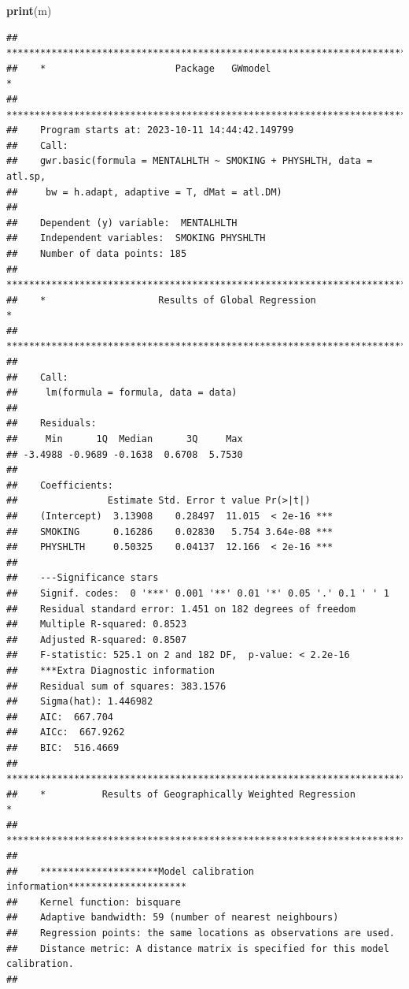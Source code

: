 \documentclass[
]{book}
\newenvironment{Shaded}{\begin{snugshade}}{\end{snugshade}}
\newcommand{\FunctionTok}[1]{\textcolor[rgb]{0.13,0.29,0.53}{\textbf{#1}}}
\newcommand{\NormalTok}[1]{#1}
\begin{document}
\begin{Shaded}
\begin{Highlighting}[]
\FunctionTok{print}\NormalTok{(m)}
\end{Highlighting}
\end{Shaded}

\begin{verbatim}
##    ***********************************************************************
##    *                       Package   GWmodel                             *
##    ***********************************************************************
##    Program starts at: 2023-10-11 14:44:42.149799 
##    Call:
##    gwr.basic(formula = MENTALHLTH ~ SMOKING + PHYSHLTH, data = atl.sp, 
##     bw = h.adapt, adaptive = T, dMat = atl.DM)
## 
##    Dependent (y) variable:  MENTALHLTH
##    Independent variables:  SMOKING PHYSHLTH
##    Number of data points: 185
##    ***********************************************************************
##    *                    Results of Global Regression                     *
##    ***********************************************************************
## 
##    Call:
##     lm(formula = formula, data = data)
## 
##    Residuals:
##     Min      1Q  Median      3Q     Max 
## -3.4988 -0.9689 -0.1638  0.6708  5.7530 
## 
##    Coefficients:
##                Estimate Std. Error t value Pr(>|t|)    
##    (Intercept)  3.13908    0.28497  11.015  < 2e-16 ***
##    SMOKING      0.16286    0.02830   5.754 3.64e-08 ***
##    PHYSHLTH     0.50325    0.04137  12.166  < 2e-16 ***
## 
##    ---Significance stars
##    Signif. codes:  0 '***' 0.001 '**' 0.01 '*' 0.05 '.' 0.1 ' ' 1 
##    Residual standard error: 1.451 on 182 degrees of freedom
##    Multiple R-squared: 0.8523
##    Adjusted R-squared: 0.8507 
##    F-statistic: 525.1 on 2 and 182 DF,  p-value: < 2.2e-16 
##    ***Extra Diagnostic information
##    Residual sum of squares: 383.1576
##    Sigma(hat): 1.446982
##    AIC:  667.704
##    AICc:  667.9262
##    BIC:  516.4669
##    ***********************************************************************
##    *          Results of Geographically Weighted Regression              *
##    ***********************************************************************
## 
##    *********************Model calibration information*********************
##    Kernel function: bisquare 
##    Adaptive bandwidth: 59 (number of nearest neighbours)
##    Regression points: the same locations as observations are used.
##    Distance metric: A distance matrix is specified for this model calibration.
## 

\end{verbatim}
\end{document}
